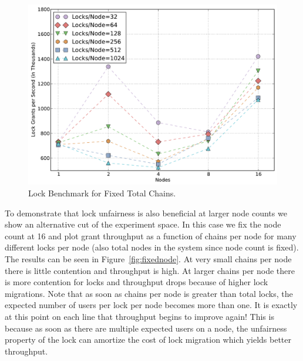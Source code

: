 \begin{figure}
\begin{center}
\includegraphics[scale=0.33]{figs/fixed_lock_chains.pdf}
\end{center}
\vspace{-6mm}
\caption{Lock Benchmark for Fixed Total Chains.\label{fig:fixedlock}}
\vspace{-4mm}
\end{figure}

To demonstrate that lock unfairness is also beneficial at larger node counts we show an alternative
cut of the experiment space.  In this case we fix the node count at 16 and plot
grant throughput as a function of chains per node for many different locks per node (also
total nodes in the system since node count is fixed).
The results can be seen in Figure~\ref{fig:fixednode}.  At very small chains per node
there is little contention and throughput is high.  At larger chains per node there is
more contention for locks and throughput drops because of higher lock migrations.  Note that 
as soon as chains per node is greater than total locks, the expected number of users per lock 
per node becomes more than one.  It is exactly at this point on each line that throughput
begins to improve again!  This is because as soon as there are multiple expected users on
a node, the unfairness property of the lock can amortize the cost of lock migration which
yields better throughput.

